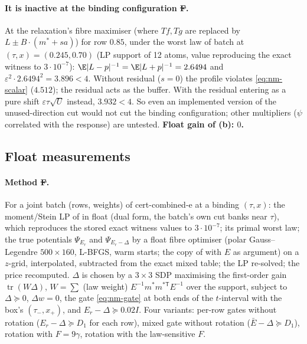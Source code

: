 \paragraph{It is inactive at the binding configuration \st{F}.} At the relaxation's fibre maximiser (where $Tf,Tg$ are replaced by $L\pm B\cdot(m^*+sa)$) for row $0.85$, under the
worst law of batch  at $(\tau,x)=(0.245,0.70)$ (LP support of 12 atoms, value reproducing the exact witness to $3\cdot10^{-7}$):
$\E|L-p|^{-1}=\E|L+p|^{-1}=2.6494$ and $\varepsilon^2\cdot2.6494^2=3.896<4$. Without residual ($s=0$) the profile violates \eqref{eq:nm-scalar} ($4.512$); the residual acts as the buffer.
With the residual entering as a pure shift $\varepsilon\tau\sqrt U$ instead, $3.932<4$. So even an implemented version of the unused-direction cut would not cut the binding
configuration; other multipliers ($\psi$ correlated with the response) are untested. \textbf{Float gain of (b): $0$.}

\subsection{Float measurements}\label{sec:nearmax-measure}
\paragraph{Method \st{F}.} For a joint batch (rows, weights) of cert-combined-e at a binding $(\tau,x)$: the moment/Stein LP of  in float (dual form, the batch's own cut
banks near $\tau$), which reproduces the stored exact witness values to $3\cdot10^{-7}$; its primal worst law; the true potentials $\Psi_{E_r}$ and $\Psi_{E_r-\Delta}$ by a float fibre
optimiser (polar Gauss--Legendre $500\times160$, L-BFGS, warm starts; the copy of  with $E$ as argument) on a $z$-grid, interpolated, subtracted from the exact mixed
table; the LP re-solved; the price recomputed. $\Delta$ is chosen by a $3\times3$ SDP maximising the first-order gain $\operatorname{tr}(W\Delta)$, $W=\sum$ (law weight)
$E^{-1}m^*m^{*\mathsf T}E^{-1}$ over the support, subject to $\Delta\succeq0$, $\Delta w=0$, the gate \eqref{eq:nm-gate} at both ends of the $t$-interval with the box's $(\tau_-,x_+)$,
and $E_r-\Delta\succeq0.02I$. Four variants: per-row gates without rotation ($E_r-\Delta\succeq D_1$ for each row), mixed gate without rotation ($\bar E-\Delta\succeq D_1$), rotation
with $F=9\gamma$, rotation with the law-sensitive $F$.

